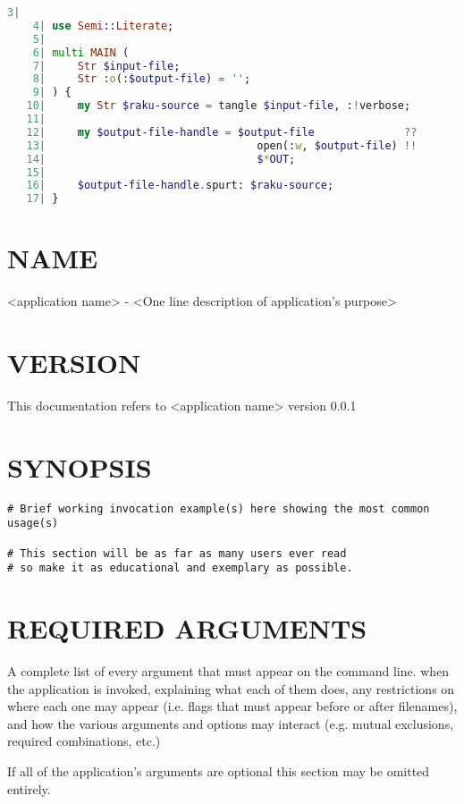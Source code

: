 \documentclass{scrartcl}
\begin{document}
\begin{lstlisting}[language=Raku]
    3| 
    4| use Semi::Literate;
    5| 
    6| multi MAIN (
    7|     Str $input-file;
    8|     Str :o(:$output-file) = '';
    9| ) {
   10|     my Str $raku-source = tangle $input-file, :!verbose;
   11| 
   12|     my $output-file-handle = $output-file              ??
   13|                                 open(:w, $output-file) !!
   14|                                 $*OUT;
   15| 
   16|     $output-file-handle.spurt: $raku-source;
   17| } 

\end{lstlisting}


\section{NAME}

<application name> - <One line description of application's purpose>

\section{VERSION}

This documentation refers to <application name> version 0.0.1

\section{SYNOPSIS}

\begin{lstlisting}[language=Perl6]
# Brief working invocation example(s) here showing the most common usage(s)

# This section will be as far as many users ever read
# so make it as educational and exemplary as possible.
\end{lstlisting}


\section{REQUIRED ARGUMENTS}

A complete list of every argument that must appear on the command line.
when the application is invoked, explaining what each of them does, any
restrictions on where each one may appear (i.e. flags that must appear
before or after filenames), and how the various arguments and options may
interact (e.g. mutual exclusions, required combinations, etc.)

If all of the application's arguments are optional this section may be
omitted entirely.
\end{document}
